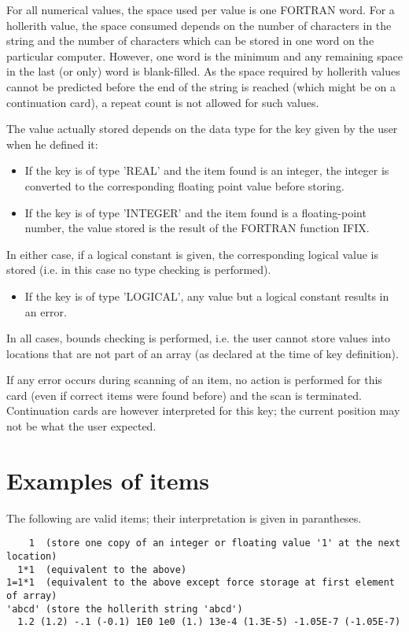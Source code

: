 For all numerical values, the space used per value is one FORTRAN word.
For a hollerith value, the space consumed depends on the number of characters
in the string and the number of characters which can be stored in one word
on the particular computer. However, one word is the minimum and any remaining
space in the last (or only) word is blank-filled.
As the space required by hollerith values cannot be predicted before the end
of the string is reached (which might be on a continuation card), a repeat
count is not allowed for such values.
 
The value actually stored depends on the data type for the key given by the
user when he defined it:
\begin{itemize}
\item
If the key is of type 'REAL' and the item found is an integer, the integer
is converted to the corresponding floating point value before storing.
\item
If the key is of type 'INTEGER' and the item found is a floating-point
number, the value stored is the result of the FORTRAN function IFIX.
\end{itemize}

In either case, if a logical constant is given, the corresponding logical
 value is stored (i.e. in this case no type checking is performed).

\begin{itemize}
\item
If the key is of type 'LOGICAL', any value but a logical constant results
in an error.
\end{itemize}
 
In all cases, bounds checking is performed, i.e. the user cannot store values
into locations that are not part of an array (as declared at the time of key
definition).
 
If any error occurs during scanning of an item, no action is performed for this
card (even if correct items were found before) and the scan is terminated.
Continuation cards are however interpreted for this key; the current position
may not be what the user expected.
 
 
\section{Examples of items}
 
The following are valid items; their interpretation is given in parantheses.
 
\begin{verbatim}
    1  (store one copy of an integer or floating value '1' at the next location)
  1*1  (equivalent to the above)
1=1*1  (equivalent to the above except force storage at first element of array)
'abcd' (store the hollerith string 'abcd')
  1.2 (1.2) -.1 (-0.1) 1E0 1e0 (1.) 13e-4 (1.3E-5) -1.05E-7 (-1.05E-7)
\end{verbatim}
 

